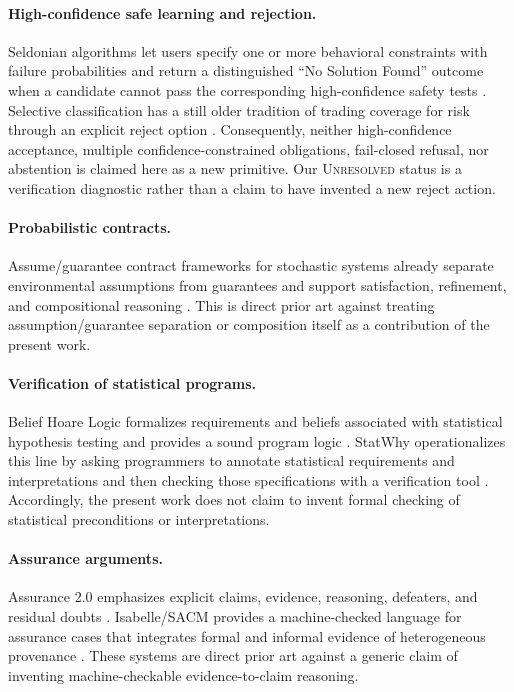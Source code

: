 \documentclass[10pt]{article}
\begin{document}
\paragraph{High-confidence safe learning and rejection.}
Seldonian algorithms let users specify one or more behavioral constraints with
failure probabilities and return a distinguished ``No Solution Found'' outcome
when a candidate cannot pass the corresponding high-confidence safety tests
\citep{ThomasEtAl2019Seldonian}.  Selective classification has a still older
tradition of trading coverage for risk through an explicit reject option
\citep{ElYanivWiener2010}.  Consequently, neither high-confidence acceptance,
multiple confidence-constrained obligations, fail-closed refusal, nor
abstention is claimed here as a new primitive.  Our \textsc{Unresolved} status
is a verification diagnostic rather than a claim to have invented a new reject
action.

\paragraph{Probabilistic contracts.}
Assume/guarantee contract frameworks for stochastic systems already separate
environmental assumptions from guarantees and support satisfaction,
refinement, and compositional reasoning \citep{DelahayeCaillaudLegay2011}.
This is direct prior art against treating assumption/guarantee separation or
composition itself as a contribution of the present work.

\paragraph{Verification of statistical programs.}
Belief Hoare Logic formalizes requirements and beliefs associated with
statistical hypothesis testing and provides a sound program logic
\citep{KawamotoSatoSuenaga2024}.  StatWhy operationalizes this line by asking
programmers to annotate statistical requirements and interpretations and then
checking those specifications with a verification tool
\citep{KawamotoKobayashiSuenaga2025}.  Accordingly, the present work does not
claim to invent formal checking of statistical preconditions or
interpretations.

\paragraph{Assurance arguments.}
Assurance 2.0 emphasizes explicit claims, evidence, reasoning, defeaters, and
residual doubts \citep{BloomfieldRushby2020}.  Isabelle/SACM provides a
machine-checked language for assurance cases that integrates formal and
informal evidence of heterogeneous provenance \citep{FosterEtAl2021}.  These
systems are direct prior art against a generic claim of inventing
machine-checkable evidence-to-claim reasoning.
\end{document}
